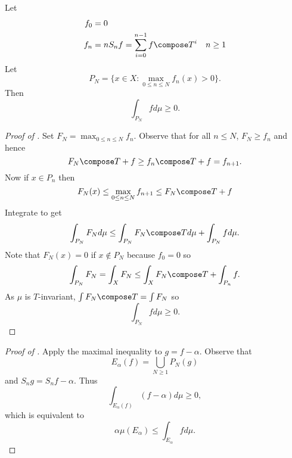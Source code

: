\documentclass[a4paper]{article}
\begin{document}
\begin{lemma}
  \label{lem:maximal inequality}
  Let
  \begin{align*}
    f_0 &= 0 \\
    f_n &= n S_nf = \sum_{i = 0}^{n - 1} f \compose T^i \quad n \geq 1
  \end{align*}
  Let
  \[
    P_N = \{x \in X: \max_{0 \leq n \leq N} f_n(x) > 0\}.
  \]
  Then
  \[
    \int_{P_N} f d\mu \geq 0.
  \]
\end{lemma}

\begin{proof}[Proof of ]
  Set \(F_N = \max_{0 \leq n \leq N} f_n\). Observe that for all \(n \leq N\), \(F_N \geq f_n\) and hence
  \[
    F_N \compose T + f \geq f_n \compose T + f = f_{n + 1}.
  \]
  Now if \(x \in P_n\) then
  \[
    F_N(x)
    \leq \max_{0 \leq n \leq N} f_{n + 1} %
    \leq F_N \compose T + f
  \]
  Integrate to get
  \[
    \int_{P_N} F_N d\mu \leq \int_{P_N} F_N \compose T d \mu + \int_{P_N} f d\mu.
  \]
  Note that \(F_N(x) = 0\) if \(x \notin P_N\) because \(f_0 = 0\) so
  \[
    \int_{P_N} F_N
    = \int_X F_N
    \leq \int_X F_N \compose T + \int_{P_n} f.
  \]
  As \(\mu\) is \(T\)-invariant, \(\int F_N \compose T = \int F_N\) so
  \[
    \int_{P_N} f d\mu \geq 0.
  \]
\end{proof}

\begin{proof}[Proof of ]
  Apply the maximal inequality to \(g = f - \alpha\). Observe that
  \[
    E_\alpha(f) = \bigcup_{N \geq 1} P_N(g)
  \]
  and \(S_n g = S_n f - \alpha\). Thus
  \[
    \int_{E_\alpha(f)} (f - \alpha) d\mu \geq 0,
  \]
  which is equivalent to
  \[
    \alpha \mu(E_\alpha) \leq \int_{E_\alpha} f d\mu.
  \]
\end{proof}
\end{document}
